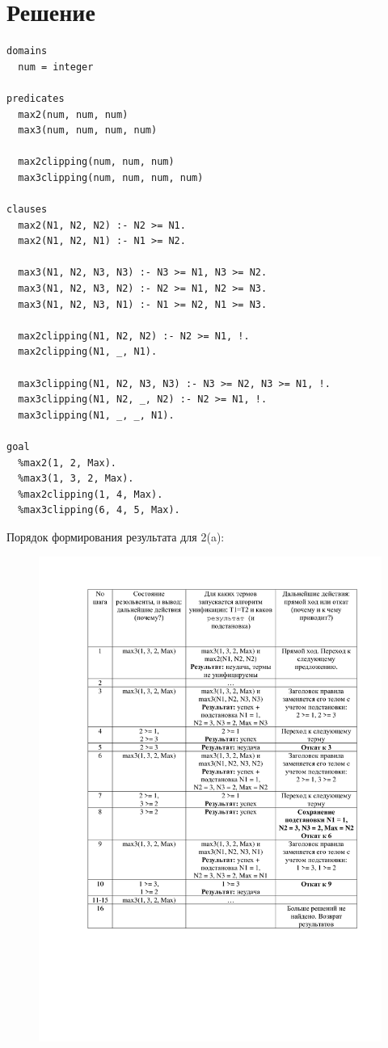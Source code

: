 \documentclass[12pt]{report}
\begin{document}
\chapter*{Решение}
\begin{lstlisting}
domains
  num = integer

predicates
  max2(num, num, num)
  max3(num, num, num, num)

  max2clipping(num, num, num)
  max3clipping(num, num, num, num)

clauses
  max2(N1, N2, N2) :- N2 >= N1.
  max2(N1, N2, N1) :- N1 >= N2.

  max3(N1, N2, N3, N3) :- N3 >= N1, N3 >= N2.
  max3(N1, N2, N3, N2) :- N2 >= N1, N2 >= N3.
  max3(N1, N2, N3, N1) :- N1 >= N2, N1 >= N3.

  max2clipping(N1, N2, N2) :- N2 >= N1, !.
  max2clipping(N1, _, N1).

  max3clipping(N1, N2, N3, N3) :- N3 >= N2, N3 >= N1, !.
  max3clipping(N1, N2, _, N2) :- N2 >= N1, !.
  max3clipping(N1, _, _, N1).

goal
  %max2(1, 2, Max).
  %max3(1, 3, 2, Max).
  %max2clipping(1, 4, Max).
  %max3clipping(6, 4, 5, Max).
\end{lstlisting}
\newpage
Порядок формирования результата для 2(a):

\begin{figure}[H]
	\centering
	\includegraphics[scale=0.275]{0.png}
	\label{fig:1}
\end{figure}
\end{document}
